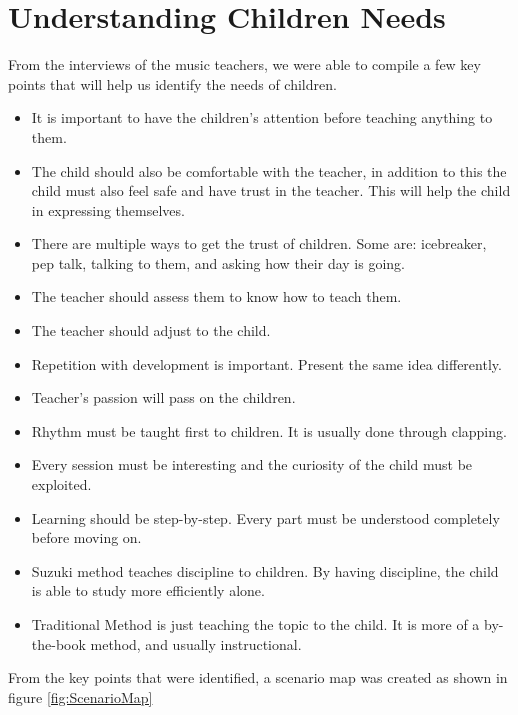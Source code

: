 \section{Understanding Children Needs}
From the interviews of the music teachers, we were able to compile a few key points that will help us identify the needs of children.
\begin{itemize}
    \item It is important to have the children's attention before teaching anything to them.
    \item The child should also be comfortable with the teacher, in addition to this the child must also feel safe and have trust in the teacher. This will help the child in expressing themselves.
    \item There are multiple ways to get the trust of children. Some are: icebreaker, pep talk, talking to them, and asking how their day is going.
    \item The teacher should assess them to know how to teach them.
    \item The teacher should adjust to the child.
    \item Repetition with development is important. Present the same idea differently.
    \item Teacher's passion will pass on the children.
    \item Rhythm must be taught first to children. It is usually done through clapping.
    \item Every session must be interesting and the curiosity of the child must be exploited.
    \item Learning should be step-by-step. Every part must be understood completely before moving on.
    \item Suzuki method teaches discipline to children. By having discipline, the child is able to study more efficiently alone.
    \item Traditional Method is just teaching the topic to the child. It is more of a by-the-book method, and usually instructional.
\end{itemize}

From the key points that were identified, a scenario map was created as shown in figure \ref{fig:ScenarioMap}


